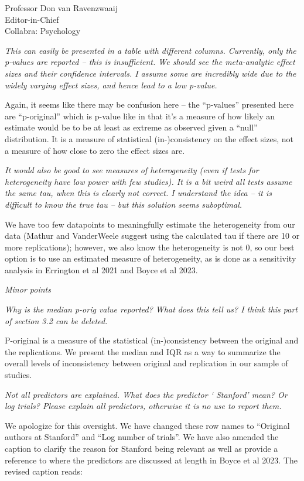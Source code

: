 \documentclass{stanfordletter}
\newcommand{\theysaid}[1]{\begin{leftbar} \noindent 
		\textsl{ #1}\end{leftbar}}
\begin{document}
\begin{letter}{Professor Don van Ravenzwaaij \\ Editor-in-Chief \\ Collabra: Psychology }
		 \theysaid{This can easily be presented in a table with different columns. Currently, only the p-values are reported – this is insufficient. We should see the meta-analytic effect sizes and their confidence intervals. I assume some are incredibly wide due to the widely varying effect sizes, and hence lead to a low p-value.}
		 
		 Again, it seems like there may be confusion here -- the ``p-values'' presented here are ``p-original'' which is p-value like in that it's a measure of how likely an estimate would be to be at least as extreme as observed given a ``null'' distribution. It is a measure of statistical (in-)consistency on the effect sizes, not a measure of how close to zero the effect sizes are. 
		 
		 
		 \theysaid{It would also be good to see measures of heterogeneity (even if tests for heterogeneity have low power with few studies). It is a bit weird all tests assume the same tau, when this is clearly not correct. I understand the idea – it is difficult to know the true tau – but this solution seems suboptimal.}
		
		We have too few datapoints to meaningfully estimate the heterogeneity from our data (Mathur and VanderWeele suggest using the calculated tau if there are 10 or more replications); however, we also know the heterogeneity is not 0, so our best option is to use an estimated measure of heterogeneity, as is done as a sensitivity analysis in Errington et al 2021 and Boyce et al 2023. 
		
		\theysaid{Minor points}
		\theysaid{Why is the median p-orig value reported? What does this tell us? I think this part of section 3.2 can be deleted.}
		
		P-original is a measure of the statistical (in-)consistency between the original and the replications. We present the median and IQR as a way to summarize the overall levels of inconsistency between original and replication in our sample of studies. 
		
		\theysaid{Not all predictors are explained. What does the predictor ‘ Stanford’ mean? Or log trials? Please explain all predictors, otherwise it is no use to report them.}
		
		We apologize for this oversight. We have changed these row names to ``Original authors at Stanford'' and 
		``Log number of trials''. We have also amended the caption to clarify the reason for Stanford being relevant as well as provide a reference to where the predictors are discussed at length in Boyce et al 2023. The revised caption reads:
		

\end{letter}
\end{document}
